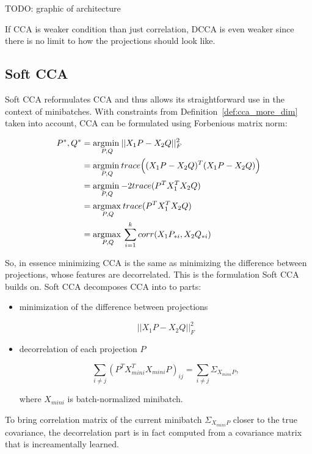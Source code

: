 TODO: graphic of architecture

If CCA is weaker condition than just correlation, DCCA is even weaker since
there is no limit to how the projections should look like.

\subsection{Soft CCA}

Soft CCA reformulates CCA and thus allows its straightforward use in the
context of minibatches. With constraints from Definition~\ref{def:cca_more_dim}
taken into account, CCA can be formulated using Forbenious matrix norm:

\begin{align}
  P^\ast, Q^\ast &= \underset{P, Q}{\operatorname*{\arg\!\min\medspace}} ||X_1P - X_2Q||^2_F \\
  &= \underset{P, Q}{\operatorname*{\arg\!\min\medspace}} trace\Big((X_1P - X_2Q)^T(X_1P - X_2Q)\Big) \\
  &= \underset{P, Q}{\operatorname*{\arg\!\min\medspace}} {-2} trace(P^TX_1^TX_2Q) \\
  &= \underset{P, Q}{\operatorname*{\arg\!\max\medspace}} trace(P^TX_1^TX_2Q) \\
  &= \underset{P, Q}{\operatorname*{\arg\!\max\medspace}} \sum_{i = 1}^k corr(X_1P_{*i}, X_2Q_{*i})
\end{align}

So, in essence minimizing CCA is the same as minimizing the difference between
projections, whose features are decorrelated. This is the formulation Soft CCA
builds on. Soft CCA decomposes CCA into to parts:

\begin{itemize}
  \item minimization of the difference between projections

    \begin{equation}
      ||X_1P - X_2Q||^2_F
    \end{equation}

  \item decorrelation of each projection $P$

    \begin{equation}
      \sum_{i \ne j} (P^TX^T_{mini}X_{mini}P)_{ij} = \sum_{i \ne j} \Sigma_{X_{mini}P},
    \end{equation}

    where $X_{mini}$ is batch-normalized minibatch.

\end{itemize}

To bring correlation matrix of the current minibatch $\Sigma_{X_{mini}P}$
closer to the true covariance, the decorrelation part is in fact computed from
a covariance matrix that is increamentally learned.

